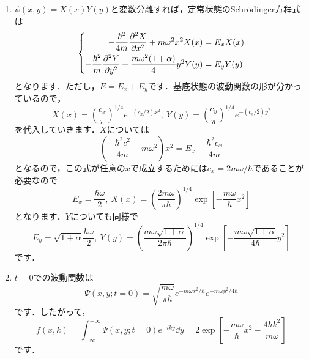 \documentclass[a4paper,pdflatex,ja=standard]{bxjsarticle}
\begin{document}
\begin{enumerate}
  \item 
  $\psi(x,y)=X(x)Y(y)$と変数分離すれば，定常状態のSchr\"{o}dinger方程式は
  \begin{equation}
    \left\{
      \begin{alignedat}{1}
        -
        \frac{\hbar^2}{4m}
        \pdv[2]{X}{x}
        +
        m\omega^2 x^2 X(x)
        &=
        E_x X(x)
        \\
        -
        \frac{\hbar^2}{m}
        \pdv[2]{Y}{y}
        +
        \frac{m\omega^2(1+\alpha)}{4}y^2 Y(y)
        &=
        E_y Y(y)
      \end{alignedat}
    \right.
  \end{equation}
  となります．ただし，$E=E_x+E_y$です．基底状態の波動関数の形が分かっているので，
  \begin{equation}
    X(x)
    =
    \left( \frac{c_x}{\pi} \right)^{1/4}
    e^{-(c_x/2)x^2}
    ,\ 
    Y(y)
    =
    \left( \frac{c_y}{\pi} \right)^{1/4}
    e^{-(c_y/2)y^2}
  \end{equation}
  を代入していきます．$X$については
  \begin{equation}
    \left(  
      -\frac{\hbar^2 c^2}{4m}
      +
      m\omega^2
    \right)
    x^2
    =
    E_x
    -
    \frac{\hbar^2 c_x}{4m}
  \end{equation}
  となるので，この式が任意の$x$で成立するためには$c_x=2m\omega/\hbar$であることが必要なので
  \begin{equation}
    E_x
    =
    \frac{\hbar\omega}{2}
    ,\ 
    X(x)
    =
    \left( \frac{2m\omega}{\pi\hbar} \right)^{1/4}
    \exp\left[ -\frac{m\omega}{\hbar}x^2 \right]
  \end{equation}
  となります．$Y$についても同様で
  \begin{equation}
    E_y
    =
    \sqrt{1+\alpha}\frac{\hbar\omega}{2}
    ,\ 
    Y(y)
    =
    \left( \frac{m\omega\sqrt{1+\alpha}}{2\pi\hbar} \right)^{1/4}
    \exp\left[ -\frac{m\omega\sqrt{1+\alpha}}{4\hbar}y^2 \right]
  \end{equation}
  です．

  \item 
  $t=0$での波動関数は
  \begin{equation}
    \Psi
    (x,y;t=0)
    =
    \sqrt{\frac{m\omega}{\pi\hbar}}
    e^{-m\omega x^2/\hbar}
    e^{-m\omega y^2/4\hbar}
  \end{equation}
  です．したがって，
  \begin{equation}
    f(x,k)
    =
    \int_{-\infty}^{+\infty}
    \Psi
    (x,y;t=0)
    e^{-iky}
    \dd y
    =
    2\exp\left[  
      -\frac{m\omega}{\hbar}x^2
      -
      \frac{4\hbar k^2}{m\omega}
    \right]
  \end{equation}
  です．


\end{enumerate}
\end{document}
